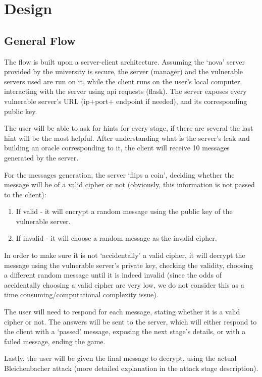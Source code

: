 \documentclass[sigconf]{acmart}
\begin{document}
\section{Design}
\subsection{General Flow}
The flow is built upon a server-client architecture. Assuming the ‘nova’ server provided by the university is secure, the server (manager) and the vulnerable servers used are run on it, while the client runs on the user’s local computer, interacting with the server using api requests (flask). The server exposes every vulnerable server’s URL (ip+port+ endpoint if needed), and its corresponding public key.

The user will be able to ask for hints for every stage, if there are several the last hint will be the most helpful. After understanding what is the server’s leak and building an oracle corresponding to it, the client will receive 10 messages generated by the server.

For the messages generation, the server ‘flips a coin’, deciding whether the message will be of a valid cipher or not (obviously, this information is not passed to the client):

\begin{enumerate}[label=-]
    \item If valid - it will encrypt a random message using the public key of the vulnerable server. 
    \item If invalid - it will choose a random message as the invalid cipher.
\end{enumerate}

In order to make sure it is not ‘accidentally’ a valid cipher, it will decrypt the message using the vulnerable server’s private key, checking the validity, choosing a different random message until it is indeed invalid (since the odds of accidentally choosing a valid cipher are very low, we do not consider this as a time consuming/computational complexity issue).

The user will need to respond for each message, stating whether it is a valid cipher or not. The answers will be sent to the server, which will either respond to the client with a ‘passed’ message, exposing the next stage’s details, or with a failed message, ending the game.

Lastly, the user will be given the final message to decrypt, using the actual Bleichenbacher attack (more detailed explanation in the attack stage description).
\end{document}
